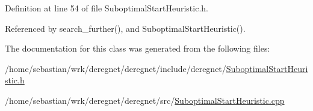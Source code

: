 Definition at line 54 of file Suboptimal\+Start\+Heuristic.\+h.



Referenced by search\+\_\+further(), and Suboptimal\+Start\+Heuristic().



The documentation for this class was generated from the following files\+:\begin{DoxyCompactItemize}
\item 
/home/sebastian/wrk/deregnet/deregnet/include/deregnet/\hyperlink{SuboptimalStartHeuristic_8h}{Suboptimal\+Start\+Heuristic.\+h}\item 
/home/sebastian/wrk/deregnet/deregnet/src/\hyperlink{SuboptimalStartHeuristic_8cpp}{Suboptimal\+Start\+Heuristic.\+cpp}\end{DoxyCompactItemize}
